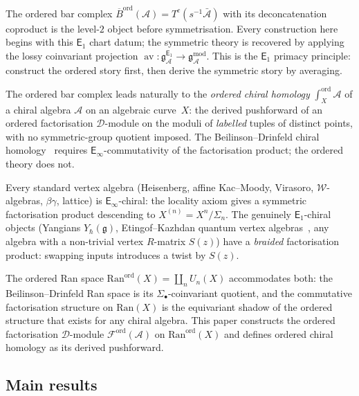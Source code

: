 \documentclass[11pt,reqno]{amsart}
\theoremstyle{definition}
\theoremstyle{remark}
\newcommand{\cA}{\mathcal{A}}
\newcommand{\cD}{\mathcal{D}}
\newcommand{\cF}{\mathcal{F}}
\newcommand{\cW}{\mathcal{W}}
\newcommand{\Ran}{\mathrm{Ran}}
\newcommand{\Eone}{\mathsf{E}_{1}}
\newcommand{\Einf}{\mathsf{E}_{\infty}}
\DeclareMathOperator{\av}{av}
\newcommand{\fg}{\mathfrak{g}}
\newcommand{\gmod}{\mathfrak{g}^{\mathrm{mod}}_{\cA}}
\newcommand{\gEone}{\mathfrak{g}^{\Eone}_{\cA}}
\newcommand{\Barord}{\overline{B}^{\mathrm{ord}}}
\numberwithin{equation}{section}
\begin{document}

The ordered bar complex $\Barord(\cA) = T^c(s^{-1}\bar{\cA})$
with its deconcatenation coproduct is the level-$2$ object before
symmetrisation. Every construction here begins with this $\Eone$
chart datum; the symmetric theory is recovered by applying the
lossy coinvariant projection
$\av \colon \gEone \to \gmod$.
This is the $\Eone$ primacy principle: construct the ordered
story first, then derive the symmetric story by averaging.

The ordered bar complex leads naturally to the \emph{ordered
chiral homology} $\int_X^{\mathrm{ord}} \cA$ of a chiral
algebra $\cA$ on an algebraic curve~$X$: the derived
pushforward of an ordered factorisation $\cD$-module on the
moduli of \emph{labelled} tuples of distinct points, with no
symmetric-group quotient imposed. The
Beilinson--Drinfeld chiral homology~\cite{BD04} requires
$\Einf$-commutativity of the factorisation product; the
ordered theory does not.

Every standard vertex algebra (Heisenberg, affine Kac--Moody,
Virasoro, $\cW$-algebras, $\beta\gamma$, lattice) is
$\Einf$-chiral: the locality axiom gives a symmetric
factorisation product descending to $X^{(n)} = X^n/\Sigma_n$.
The genuinely $\Eone$-chiral objects (Yangians
$Y_\hbar(\fg)$, Etingof--Kazhdan quantum vertex
algebras~\cite{EK00}, any algebra with a non-trivial vertex
$R$-matrix $S(z)$) have a \emph{braided} factorisation
product: swapping inputs introduces a twist by $S(z)$.

The ordered Ran space
$\Ran^{\mathrm{ord}}(X) = \coprod_n U_n(X)$ accommodates
both: the Beilinson--Drinfeld Ran space is its
$\Sigma_\bullet$-coinvariant quotient, and the commutative
factorisation structure on $\Ran(X)$ is the equivariant
shadow of the ordered structure that exists for any chiral
algebra. This paper constructs the ordered factorisation
$\cD$-module $\cF^{\mathrm{ord}}(\cA)$ on
$\Ran^{\mathrm{ord}}(X)$ and defines ordered chiral homology
as its derived pushforward.

\subsection{Main results}
\end{document}
